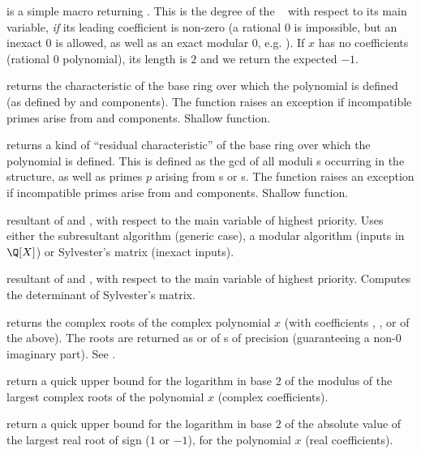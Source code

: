  is a simple macro returning .
This is the degree of the ~ with respect to its main
variable, \emph{if} its leading coefficient is non-zero (a rational $0$ is
impossible, but an inexact $0$ is allowed, as well as an exact modular $0$,
e.g. ). If $x$ has no coefficients (rational $0$ polynomial),
its length is $2$ and we return the expected $-1$.

 returns the characteristic of the
base ring over which the polynomial is defined (as defined by 
and  components). The function raises an exception if incompatible
primes arise from  and  components. Shallow function.

 returns a kind of ``residual
characteristic'' of the base ring over which the polynomial is defined. This
is defined as the gcd of all moduli s occurring in the structure,
as well as primes $p$ arising from s or s. The function
raises an exception if incompatible primes arise from  and
 components. Shallow function.

 resultant of  and , with
respect to the main variable of highest priority. Uses either the
subresultant algorithm (generic case), a modular algorithm (inputs in
$\Q[X]$) or Sylvester's matrix (inexact inputs).

 resultant of  and , with
respect to the main variable of highest priority. Computes the determinant
of Sylvester's matrix.

 returns the complex roots of
the complex polynomial $x$ (with coefficients , ,
 or  of the above). The roots are returned
as  or  of s of precision 
(guaranteeing a non-$0$ imaginary part). See .

 return a quick upper bound for the
logarithm in base $2$ of the modulus of the largest complex roots of
the polynomial $x$ (complex coefficients).

 return a quick upper
bound for the logarithm in base $2$ of the absolute value of the largest
real root of sign  ($1$ or $-1$), for the polynomial $x$ (real
coefficients).

